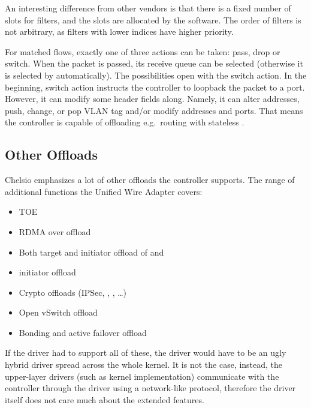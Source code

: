 An interesting difference from other vendors is that there is a fixed number of
slots for filters, and the slots are allocated by the software. The order of
filters is not arbitrary, as filters with lower indices have higher priority.

For matched flows, exactly one of three actions can be taken: pass, drop or
switch. When the packet is passed, its receive queue can be selected (otherwise
it is selected by  automatically). The possibilities open with the switch
action. In the beginning, switch action instructs the controller to loopback
the packet to a port. However, it can modify some header fields along. Namely,
it can alter  addresses, push, change, or pop VLAN tag and/or modify 
addresses and  ports. That means the controller is capable of offloading
e.g.\ routing with stateless .

\subsection{Other Offloads}

Chelsio emphasizes a lot of other offloads the controller supports. The range
of additional functions the Unified Wire Adapter covers:

\begin{itemize}
\item {}\acrfull{TOE} %
\item \acrfull{RDMA} over  offload
\item Both target and initiator offload of  and 
\item {} initiator offload
\item Crypto offloads (IPSec, , , \dots)
\item Open vSwitch offload
\item Bonding and active failover offload
\end{itemize}

If the  driver had to support all of these, the driver would have to be
an ugly hybrid driver spread across the whole kernel. It is not the case,
instead, the upper-layer drivers (such as  kernel implementation)
communicate with the controller through the  driver using a network-like
protocol, therefore the  driver itself does not care much about the
extended features.
